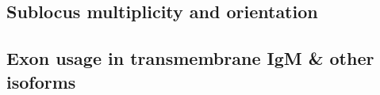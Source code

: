 	\subsection{Sublocus multiplicity and orientation}
	
	\subsection{Exon usage in transmembrane IgM \& other isoforms}






%
%
%
